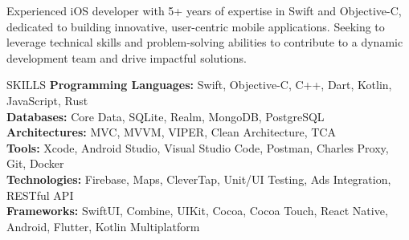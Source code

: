 \documentclass{resume} %
\begin{document}

{Experienced iOS developer with 5+ years of expertise in Swift and Objective-C, dedicated to building innovative, user-centric mobile applications. Seeking to leverage technical skills and problem-solving abilities to contribute to a dynamic development team and drive impactful solutions.}


\begin{rSection}{SKILLS}
\textbf{Programming Languages:} Swift, Objective-C, C++, Dart, Kotlin, JavaScript, Rust \\[0.2em]
\textbf{Databases:} Core Data, SQLite, Realm, MongoDB, PostgreSQL \\[0.2em]
\textbf{Architectures:} MVC, MVVM, VIPER, Clean Architecture, TCA \\[0.2em]
\textbf{Tools:} Xcode, Android Studio, Visual Studio Code, Postman, Charles Proxy, Git, Docker \\[0.2em]
\textbf{Technologies:} Firebase, Maps, CleverTap, Unit/UI Testing, Ads Integration, RESTful API \\[0.2em]
\textbf{Frameworks:} SwiftUI, Combine, UIKit, Cocoa, Cocoa Touch, React Native, Android, Flutter, Kotlin Multiplatform
\end{rSection}

\end{document}

